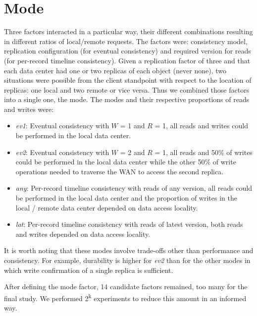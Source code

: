 \documentclass[man,floatsintext,12pt]{apa6}
\begin{document}
\section{Mode}

Three factors interacted in a particular way, their different combinations
resulting in different ratios of local/remote requests. The factors were:
consistency model, replication configuration (for eventual consistency) and
required version for reads (for per-record timeline consistency). Given a
replication factor of three and that each data center had one or two replicas
of each object (never none), two situations were possible from the client
standpoint with respect to the location of replicas: one local and two remote
or vice versa. Thus we combined those factors into a single one, the mode. The
modes and their respective proportions of reads and writes were:

\begin{itemize}

\item \textit{ev1}: Eventual consistency with $W$ = 1 and $R$ = 1, all reads
and writes could be performed in the local data center.

\item \textit{ev2}: Eventual consistency with $W$ = 2 and $R$ = 1, all reads
and 50\% of writes could be performed in the local data center while the other
50\% of write operations needed to traverse the WAN to access the second
replica.

\item \textit{any}: Per-record timeline consistency with reads of any version,
all reads could be performed in the local data center and the proportion of
writes in the local / remote data center depended on data access locality.

\item \textit{lat}: Per-record timeline consistency with reads of latest
version, both reads and writes depended on data access locality.

\end{itemize}

It is worth noting that these modes involve trade-offs other than performance
and consistency. For example, durability is higher for \textit{ev2} than for
the other modes in which write confirmation of a single replica is sufficient.

After defining the mode factor, 14 candidate factors remained, too many for the
final study. We performed 2\textsuperscript{k} experiments to reduce this
amount in an informed way.
\end{document}
